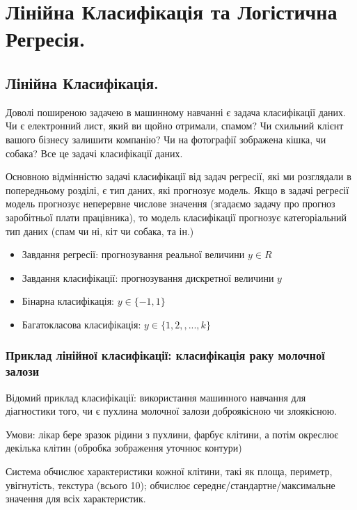 \chapter{Лінійна Класифікація та Логістична Регресія.}

\section{Лінійна Класифікація.}

Доволі поширеною задачею в машинному навчанні є задача класифікації даних. Чи є електронний лист, який ви щойно отримали, спамом? Чи схильний клієнт вашого бізнесу залишити компанію? Чи на фотографії зображена кішка, чи собака? Все це задачі класифікації даних.

Основною відмінністю задачі класифікації від задач регресії, які ми розглядали в попередньому розділі, є тип даних, які прогнозує модель. Якщо в задачі регресії модель прогнозує неперервне числове значення (згадаємо задачу про прогноз заробітньої плати працівника), то модель класифікації прогнозує категоріальний тип даних (спам чи ні, кіт чи собака, та ін.)

\begin{itemize}
\item Завдання регресії: прогнозування реальної величини $y\in R$
\item Завдання класифікації: прогнозування дискретної величини $y$
\item Бінарна класифікація: $y\in \{-1,1\}$
\item Багатокласова класифікація: $y\in \{1,2,,..., k\}$
\end{itemize}



\subsection{Приклад лінійної класифікації: класифікація раку молочної залози}

Відомий приклад класифікації: використання машинного навчання для діагностики того, чи є 
пухлина молочної залози доброякісною чи злоякісною.

Умови: лікар бере зразок рідини з пухлини, фарбує клітини, а потім окреслює 
декілька клітин (обробка зображення уточнює контури)

Система обчислює характеристики кожної клітини, такі як площа, периметр, увігнутість, текстура 
(всього 10); обчислює середнє/стандартне/максимальне значення для всіх характеристик.


